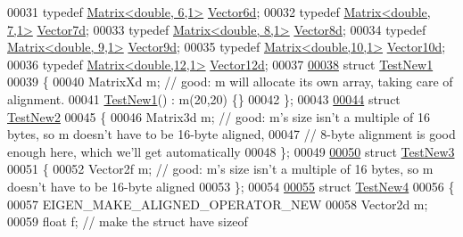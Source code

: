 \begin{DoxyCode}
00031 \textcolor{keyword}{typedef} \hyperlink{group___core___module_class_eigen_1_1_matrix}{Matrix<double, 6,1>} \hyperlink{group___core___module_class_eigen_1_1_matrix}{Vector6d};
00032 \textcolor{keyword}{typedef} \hyperlink{group___core___module_class_eigen_1_1_matrix}{Matrix<double, 7,1>} \hyperlink{group___core___module_class_eigen_1_1_matrix}{Vector7d};
00033 \textcolor{keyword}{typedef} \hyperlink{group___core___module_class_eigen_1_1_matrix}{Matrix<double, 8,1>} \hyperlink{group___core___module_class_eigen_1_1_matrix}{Vector8d};
00034 \textcolor{keyword}{typedef} \hyperlink{group___core___module_class_eigen_1_1_matrix}{Matrix<double, 9,1>} \hyperlink{group___core___module_class_eigen_1_1_matrix}{Vector9d};
00035 \textcolor{keyword}{typedef} \hyperlink{group___core___module_class_eigen_1_1_matrix}{Matrix<double,10,1>} \hyperlink{group___core___module_class_eigen_1_1_matrix}{Vector10d};
00036 \textcolor{keyword}{typedef} \hyperlink{group___core___module_class_eigen_1_1_matrix}{Matrix<double,12,1>} \hyperlink{group___core___module_class_eigen_1_1_matrix}{Vector12d};
00037 
\hyperlink{struct_test_new1}{00038} \textcolor{keyword}{struct }\hyperlink{struct_test_new1}{TestNew1}
00039 \{
00040   MatrixXd m; \textcolor{comment}{// good: m will allocate its own array, taking care of alignment.}
00041   \hyperlink{struct_test_new1}{TestNew1}() : m(20,20) \{\}
00042 \};
00043 
\hyperlink{struct_test_new2}{00044} \textcolor{keyword}{struct }\hyperlink{struct_test_new2}{TestNew2}
00045 \{
00046   Matrix3d m; \textcolor{comment}{// good: m's size isn't a multiple of 16 bytes, so m doesn't have to be 16-byte aligned,}
00047               \textcolor{comment}{// 8-byte alignment is good enough here, which we'll get automatically}
00048 \};
00049 
\hyperlink{struct_test_new3}{00050} \textcolor{keyword}{struct }\hyperlink{struct_test_new3}{TestNew3}
00051 \{
00052   Vector2f m; \textcolor{comment}{// good: m's size isn't a multiple of 16 bytes, so m doesn't have to be 16-byte aligned}
00053 \};
00054 
\hyperlink{struct_test_new4}{00055} \textcolor{keyword}{struct }\hyperlink{struct_test_new4}{TestNew4}
00056 \{
00057   EIGEN\_MAKE\_ALIGNED\_OPERATOR\_NEW
00058   Vector2d m;
00059   \textcolor{keywordtype}{float} f; \textcolor{comment}{// make the struct have sizeof%
}
\end{DoxyCode}
